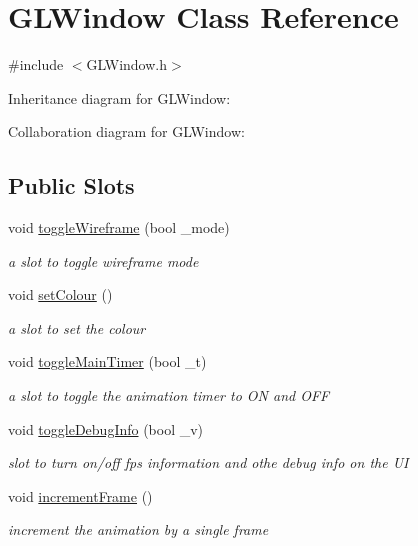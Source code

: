 \hypertarget{class_g_l_window}{\section{G\-L\-Window Class Reference}
\label{class_g_l_window}
}


{\ttfamily \#include $<$G\-L\-Window.\-h$>$}



Inheritance diagram for G\-L\-Window\-:


Collaboration diagram for G\-L\-Window\-:
\subsection*{Public Slots}
\begin{DoxyCompactItemize}
\item 
void \hyperlink{class_g_l_window_a12c3d0e90d6cc3216cb99b0479840ad8}{toggle\-Wireframe} (bool \-\_\-mode)
\begin{DoxyCompactList}\small\item\em a slot to toggle wireframe mode \end{DoxyCompactList}\item 
void \hyperlink{class_g_l_window_ab70adc972efa7e79d94ed194a67af8ce}{set\-Colour} ()
\begin{DoxyCompactList}\small\item\em a slot to set the colour \end{DoxyCompactList}\item 
void \hyperlink{class_g_l_window_a10127d1e15f8e343772f57de2c7df7c2}{toggle\-Main\-Timer} (bool \-\_\-t)
\begin{DoxyCompactList}\small\item\em a slot to toggle the animation timer to O\-N and O\-F\-F \end{DoxyCompactList}\item 
void \hyperlink{class_g_l_window_ae50bf7097fa8c21a0f7c752fb26c060f}{toggle\-Debug\-Info} (bool \-\_\-v)
\begin{DoxyCompactList}\small\item\em slot to turn on/off fps information and othe debug info on the U\-I \end{DoxyCompactList}\item 
void \hyperlink{class_g_l_window_a11dd8c963297d459f9debc33bb9292d8}{increment\-Frame} ()
\begin{DoxyCompactList}\small\item\em increment the animation by a single frame \end{DoxyCompactList}\item 

\end{DoxyCompactItemize}
